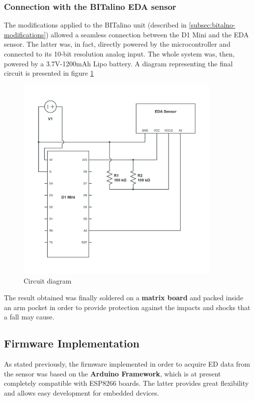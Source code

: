 \subsubsection{Connection with the BITalino EDA sensor}\label{subsubsec:d1mini}

The modifications applied to the BITalino unit (described in \ref{subsec:bitalno-modifications}) allowed a seamless connection between the D1 Mini and the EDA sensor. The latter was, in fact, directly powered by the microcontroller and connected to its 10-bit resolution analog input. The whole system was, then, powered by a 3.7V-1200mAh Lipo battery. A diagram representing the final circuit is presented in figure \ref{fig:circuit-diagram}

\begin{figure}[h]
    \centering
    \includegraphics[width=10cm]{./images/circuit-diagram.png}
    \caption{Circuit diagram}
    \label{fig:circuit-diagram}
\end{figure}

The result obtained was finally soldered on a \textbf{matrix board} and packed inside an arm pocket in order to provide protection against the impacts and shocks that a fall may cause.  

\subsection{Firmware Implementation}\label{subsec:firmware-implementation}

As stated previously, the firmware implemented in order to acquire ED data from the sensor was based on the \textbf{Arduino Framework}, which is at present completely compatible with ESP8266 boards. The latter provides great flexibility and allows easy development for embedded devices. 

